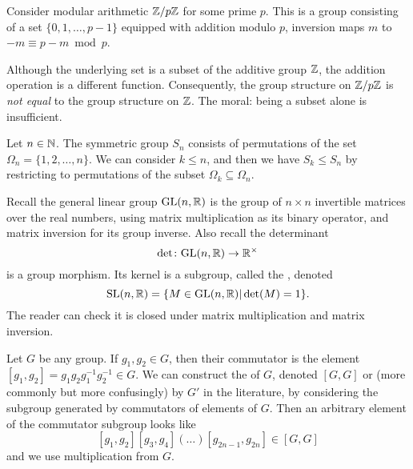 \begin{example}
  Consider modular arithmetic $\mathbb{Z}/p\mathbb{Z}$ for some prime $p$. This is a
  group consisting of a set $\{0,1,\dots,p-1\}$ equipped with addition
  modulo $p$, inversion maps $m$ to $-m\equiv p-m\bmod{p}$.

  Although the underlying set is a subset of the additive group $\mathbb{Z}$,
  the addition operation is a different function. Consequently, the
  group structure on $\mathbb{Z}/p\mathbb{Z}$ is \emph{not equal} to the group
  structure on $\mathbb{Z}$. The moral: being a subset alone is insufficient.
\end{example}

\begin{example}
Let $n\in\mathbb{N}$. The symmetric group $S_{n}$ consists of permutations of
the set $\Omega_{n}=\{1,2,\dots,n\}$. We can consider $k\leq n$, and
then we have $S_{k}\leq S_{n}$ by restricting to permutations of the
subset $\Omega_{k}\subseteq\Omega_{n}$.
\end{example}

\begin{example}
Recall the general linear group $\mathrm{GL}(n,\mathbb{R})$ is the group of $n\times n$
invertible matrices over the real numbers, using matrix multiplication
as its binary operator, and matrix inversion for its group inverse. Also
recall the determinant
\begin{equation}
  \det\colon\mathrm{GL}(n,\mathbb{R})\to\mathbb{R}^{\times}
\end{equation}
is a group morphism. Its kernel is a subgroup, called the
, denoted
\begin{equation}
\mathrm{SL}(n,\mathbb{R})=\{M\in\mathrm{GL}(n,\mathbb{R})|\det(M)=1\}.
\end{equation}
The reader can check it is closed under matrix multiplication and matrix
inversion. 
\end{example}

\begin{example}\label{ex:004-subgroups:commutator-subgroup}
Let $G$ be any group. If $g_{1},g_{2}\in G$, then their commutator is
the element $[g_{1},g_{2}]=g_{1}g_{2}g_{1}^{-1}g_{2}^{-1}\in G$.
We can construct the  of $G$, denoted
$[G,G]$ or (more commonly but more confusingly) by $G'$ in the literature,
by considering the subgroup generated by commutators of elements of $G$.
Then an arbitrary element of the commutator subgroup looks like
\begin{equation}
{}  [g_{1},g_{2}][g_{3},g_{4}](\dots)[g_{2n-1},g_{2n}]\in[G,G]
\end{equation}
and we use multiplication from $G$.
\end{example}

